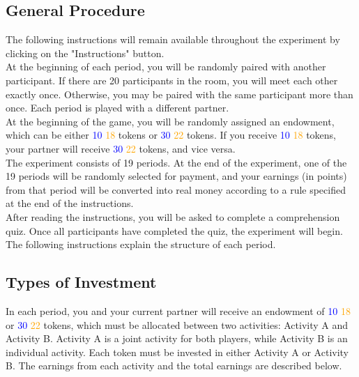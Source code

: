 \documentclass[12pt]{article}
\newcommand{\periods}{19 }
\begin{document}
\subsection*{General Procedure}

\noindent The following instructions will remain available throughout the experiment by clicking on the "Instructions" button.\\

\noindent At the beginning of each period, you will be randomly paired with another participant. If there are 20 participants in the room, you will meet each other exactly once. Otherwise, you may be paired with the same participant more than once. Each period is played with a different partner.\\

\noindent At the beginning of the game, you will be randomly assigned an endowment, which can be either \textcolor{blue}{10} \textcolor{orange}{18} tokens or \textcolor{blue}{30} \textcolor{orange}{22} tokens. If you receive \textcolor{blue}{10} \textcolor{orange}{18} tokens, your partner will receive \textcolor{blue}{30} \textcolor{orange}{22} tokens, and vice versa.\\

\noindent The experiment consists of \periods periods. At the end of the experiment, one of the \periods periods will be randomly selected for payment, and your earnings (in points) from that period will be converted into real money according to a rule specified at the end of the instructions.\\

\noindent After reading the instructions, you will be asked to complete a comprehension quiz. Once all participants have completed the quiz, the experiment will begin.\\

\noindent The following instructions explain the structure of each period.

\subsection*{Types of Investment}

\noindent In each period, you and your current partner will receive an endowment of \textcolor{blue}{10} \textcolor{orange}{18} or \textcolor{blue}{30} \textcolor{orange}{22} tokens, which must be allocated between two activities: Activity A and Activity B. Activity A is a joint activity for both players, while Activity B is an individual activity. Each token must be invested in either Activity A or Activity B. The earnings from each activity and the total earnings are described below.
\end{document}
